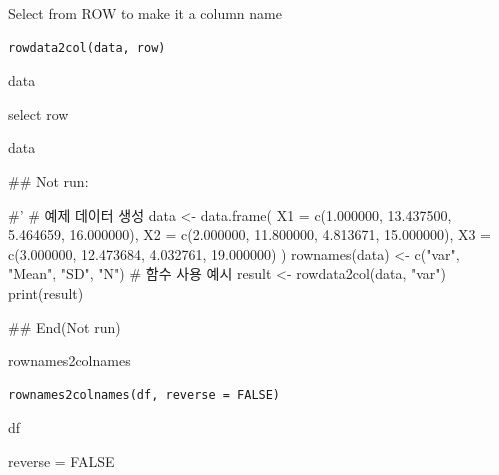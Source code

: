 \documentclass[a4paper]{book}
\begin{document}
%
\begin{Description}
Select from ROW to make it a column name
\end{Description}
%
\begin{Usage}
\begin{verbatim}
rowdata2col(data, row)
\end{verbatim}
\end{Usage}
%
\begin{Arguments}
\begin{ldescription}
\item[\code{data}] data

\item[\code{row}] select row
\end{ldescription}
\end{Arguments}
%
\begin{Value}
data
\end{Value}
%
\begin{Examples}
\begin{ExampleCode}


\#\# Not run: 

#'
# 예제 데이터 생성
data <- data.frame(
  X1 = c(1.000000, 13.437500, 5.464659, 16.000000),
  X2 = c(2.000000, 11.800000, 4.813671, 15.000000),
  X3 = c(3.000000, 12.473684, 4.032761, 19.000000)
)
rownames(data) <- c("var", "Mean", "SD", "N")
# 함수 사용 예시
result <- rowdata2col(data, "var")
print(result)



## End(Not run)
\end{ExampleCode}
\end{Examples}
%
\begin{Description}
rownames2colnames
\end{Description}
%
\begin{Usage}
\begin{verbatim}
rownames2colnames(df, reverse = FALSE)
\end{verbatim}
\end{Usage}
%
\begin{Arguments}
\begin{ldescription}
\item[\code{df}] df

\item[\code{reverse}] reverse = FALSE
\end{ldescription}
\end{Arguments}
\end{document}
